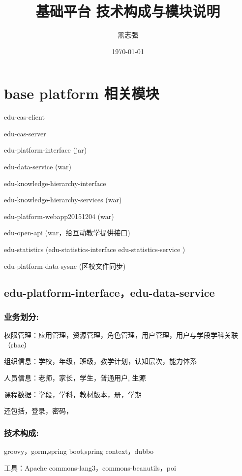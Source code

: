 \documentclass[UTF8]{ctexart}
\title{基础平台 技术构成与模块说明}
\author{黑志强}
\date{\today}
\begin{document}
 \maketitle
 \tableofcontents



\section{base platform 相关模块 }
\begin{figure}[ht!]
\end{figure}

edu-cas-client

edu-cas-server

edu-platform-interface  (jar)

edu-data-service (war)

edu-knowledge-hierarchy-interface

edu-knowledge-hierarchy-services (war)

edu-platform-webapp20151204 (war)

edu-open-api (war，给互动教学提供接口)

edu-statistics (edu-statistics-interface edu-statistics-service )

edu-platform-data-sysnc (区校文件同步)


\subsection{edu-platform-interface，edu-data-service}

\subsubsection{业务划分:}
权限管理：应用管理，资源管理，角色管理，用户管理，用户与学段学科关联（rbac）

组织信息：学校，年级，班级，教学计划，认知层次，能力体系

人员信息：老师，家长，学生，普通用户, 生源

课程数据：学段，学科，教材版本，册，学期

还包括，登录，密码，

\subsubsection{技术构成:}
groovy，gorm,spring boot,spring context，dubbo

工具：Apache commons-lang3，commons-beanutils，poi
\end{document}
